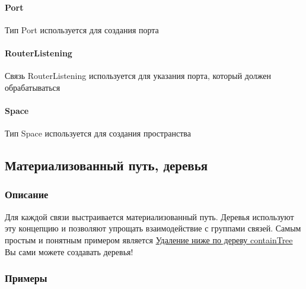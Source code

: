 \documentclass{article}
\begin{document}
\paragraph*{Port}
Тип Port\hypertarget{Port.Def}{} используется для создания порта
\paragraph*{RouterListening}
Связь RouterListening\hypertarget{RouterListening.Def}{} используется для
указания порта, который должен обрабатываться
\paragraph*{Space}
Тип Space\hypertarget{Space.Def}{} используется для создания пространства

\subsection{Материализованный путь, деревья}
\subsubsection{Описание}
Для каждой связи выстраивается материализованный путь. Деревья используют эту
концепцию и позволяют упрощать взаимодействие с группами связей.
Самым простым и понятным примером является
\hyperlink{containTree.Deletion.Example}{Удаление ниже по дереву containTree}
Вы сами можете создавать деревья!
\subsubsection{Примеры}
\end{document}

